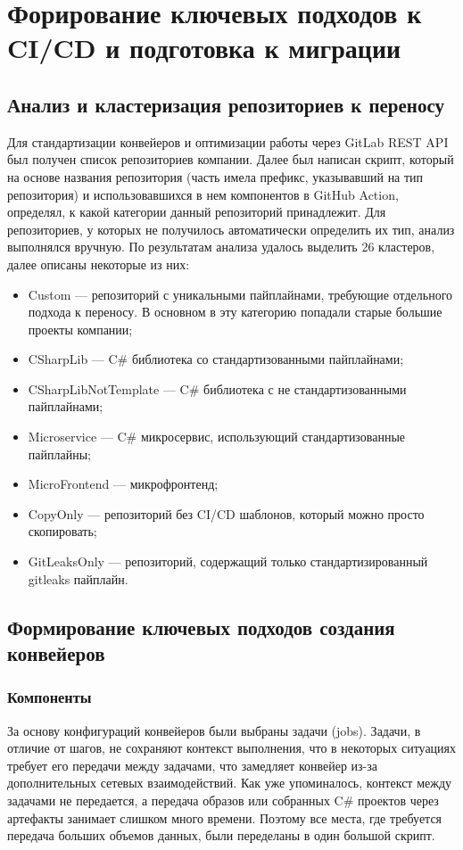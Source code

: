 \chapter{Форирование ключевых подходов к CI/CD и подготовка к миграции} \label{ch:ch2}

\section{Анализ и кластеризация репозиториев к переносу} \label{sec:repository-analysis}
Для стандартизации конвейеров и оптимизации работы через GitLab REST API\cite{gl-rest-api} был получен список репозиториев компании.
Далее был написан скрипт,
который на основе названия репозитория (часть имела префикс, указывавший на тип репозитория) и использовавшихся в нем компонентов в GitHub Action,
определял, к какой категории данный репозиторий принадлежит.
Для репозиториев, у которых не получилось автоматически определить их тип, анализ выполнялся вручную.
По результатам анализа удалось выделить 26 кластеров, далее описаны некоторые из них:
\begin{itemize}
  \item Custom — репозиторий с уникальными пайплайнами, требующие отдельного подхода к переносу.
        В основном в эту категорию попадали старые большие проекты компании;
  \item CSharpLib — C\# библиотека со стандартизованными пайплайнами;
  \item CSharpLibNotTemplate — C\# библиотека с не стандартизованными пайплайнами;
  \item Microservice — C\# микросервис, использующий стандартизованные пайплайны;
  \item MicroFrontend — микрофронтенд;
  \item CopyOnly — репозиторий без CI/CD шаблонов, который можно просто скопировать;
  \item GitLeaksOnly — репозиторий, содержащий только стандартизированный gitleaks пайплайн.
\end{itemize}

\section{Формирование ключевых подходов создания конвейеров} \label{sec:gitlab-pipelines-key-principles}
\subsection{Компоненты} \label{subsec:components}
За основу конфигураций конвейеров были выбраны задачи (jobs).
Задачи, в отличие от шагов, не сохраняют контекст выполнения, что в некоторых ситуациях требует его передачи между задачами,
что замедляет конвейер из-за дополнительных сетевых взаимодействий.
Как уже упоминалось, контекст между задачами не передается, а передача образов или собранных C\# проектов через артефакты занимает слишком много времени.
Поэтому все места, где требуется передача больших объемов данных, были переделаны в один большой скрипт.

